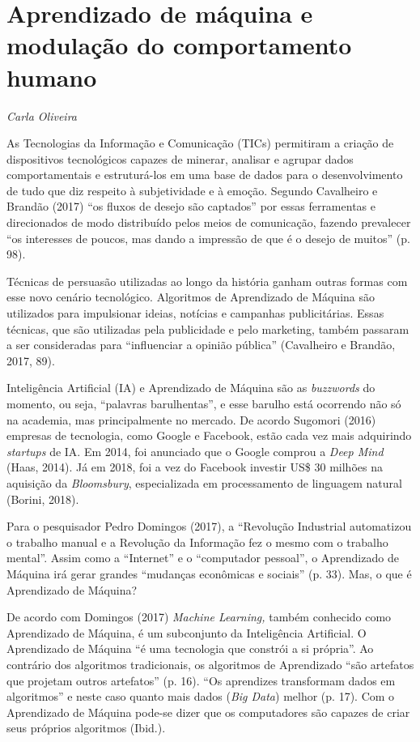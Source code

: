 \chapter{Aprendizado de máquina e modulação do comportamento humano}

\begin{flushright}
\emph{Carla Oliveira}
\end{flushright}

As Tecnologias da Informação e Comunicação (TICs) permitiram a criação
de dispositivos tecnológicos capazes de minerar, analisar e agrupar
dados comportamentais e estruturá-los em uma base de dados para o
desenvolvimento de tudo que diz respeito à subjetividade e à emoção.
Segundo Cavalheiro e Brandão (2017) ``os fluxos de desejo são captados''
por essas ferramentas e direcionados de modo distribuído pelos meios de
comunicação, fazendo prevalecer ``os interesses de poucos, mas dando a
impressão de que é o desejo de muitos'' (p. 98).

Técnicas de persuasão utilizadas ao longo da história ganham outras
formas com esse novo cenário tecnológico. Algoritmos de Aprendizado de
Máquina são utilizados para impulsionar ideias, notícias e campanhas
publicitárias. Essas técnicas, que são utilizadas pela publicidade e
pelo marketing, também passaram a ser consideradas para ``influenciar a
opinião pública'' (Cavalheiro e Brandão, 2017, 89).

Inteligência Artificial (IA) e Aprendizado de Máquina são as
\emph{buzzwords} do momento, ou seja, ``palavras barulhentas'', e esse
barulho está ocorrendo não só na academia, mas principalmente no
mercado. De acordo Sugomori (2016) empresas de tecnologia, como Google e
Facebook, estão cada vez mais adquirindo \emph{startups} de IA. Em 2014,
foi anunciado que o Google comprou a \emph{Deep Mind} (Haas, 2014). Já
em 2018, foi a vez do Facebook investir US\$ 30 milhões na aquisição da
\emph{Bloomsbury}, especializada em processamento de linguagem natural
(Borini, 2018).

Para o pesquisador Pedro Domingos (2017), a ``Revolução Industrial
automatizou o trabalho manual e a Revolução da Informação fez o mesmo
com o trabalho mental''. Assim como a ``Internet'' e o ``computador
pessoal'', o Aprendizado de Máquina irá gerar grandes ``mudanças
econômicas e sociais'' (p. 33). Mas, o que é Aprendizado de Máquina?

De acordo com Domingos (2017) \emph{Machine Learning,} também conhecido
como Aprendizado de Máquina, é um subconjunto da Inteligência
Artificial. O Aprendizado de Máquina ``é uma tecnologia que constrói a
si própria''. Ao contrário dos algoritmos tradicionais, os algoritmos de
Aprendizado ``são artefatos que projetam outros artefatos'' (p. 16).
``Os aprendizes transformam dados em algoritmos'' e neste caso quanto
mais dados (\emph{Big Data}) melhor (p. 17). Com o Aprendizado de
Máquina pode-se dizer que os computadores são capazes de criar seus
próprios algoritmos (Ibid.).

